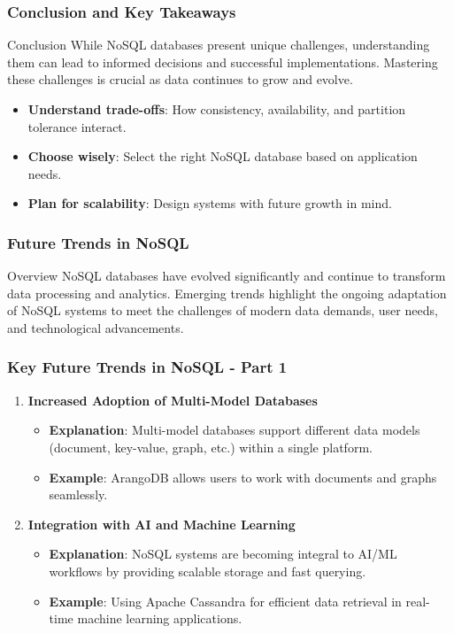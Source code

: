 \documentclass[aspectratio=169]{beamer}
\begin{document}
\begin{frame}[fragile]
    \frametitle{Conclusion and Key Takeaways}
    
    \begin{block}{Conclusion}
        While NoSQL databases present unique challenges, understanding them can lead to informed decisions and successful implementations.
        Mastering these challenges is crucial as data continues to grow and evolve.
    \end{block}
    
    \begin{itemize}
        \item \textbf{Understand trade-offs}: How consistency, availability, and partition tolerance interact.
        \item \textbf{Choose wisely}: Select the right NoSQL database based on application needs.
        \item \textbf{Plan for scalability}: Design systems with future growth in mind.
    \end{itemize}
\end{frame}

\begin{frame}[fragile]
    \frametitle{Future Trends in NoSQL}
    \begin{block}{Overview}
        NoSQL databases have evolved significantly and continue to transform data processing and analytics. Emerging trends highlight the ongoing adaptation of NoSQL systems to meet the challenges of modern data demands, user needs, and technological advancements.
    \end{block}
\end{frame}

\begin{frame}[fragile]
    \frametitle{Key Future Trends in NoSQL - Part 1}
    \begin{enumerate}
        \item \textbf{Increased Adoption of Multi-Model Databases}
            \begin{itemize}
                \item \textbf{Explanation}: Multi-model databases support different data models (document, key-value, graph, etc.) within a single platform.
                \item \textbf{Example}: ArangoDB allows users to work with documents and graphs seamlessly.
            \end{itemize}
            
        \item \textbf{Integration with AI and Machine Learning}
            \begin{itemize}
                \item \textbf{Explanation}: NoSQL systems are becoming integral to AI/ML workflows by providing scalable storage and fast querying.
                \item \textbf{Example}: Using Apache Cassandra for efficient data retrieval in real-time machine learning applications.
            \end{itemize}
    \end{enumerate}
\end{frame}
\end{document}
